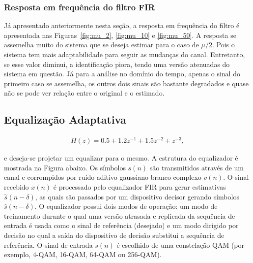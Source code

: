 \subsubsection*{Resposta em frequência do ﬁltro FIR}
Já apresentado anteriormente nesta seção, a resposta em frequência do filtro é apresentada nas Figuras~\ref{fig:mu_2}, \ref{fig:mu_10} e \ref{fig:mu_50}. A resposta se assemelha muito do sistema que se deseja estimar para o caso de $\mu/2$. Pois o sistema tem mais adaptabilidade para seguir as mudanças do canal. Entretanto, se esse valor diminui, a identificação piora, tendo uma versão atenuadas do sistema em questão. Já para a análise no domínio do tempo, apenas o sinal do primeiro caso se assemelha, os outros dois sinais são bastante degradados e quase não se pode ver relação entre o original e o estimado.


\subsection{Equalização Adaptativa} %

    
\begin{align*}
    H(z) = 0.5 + 1.2z^{-1} + 1.5z^{-2} + z^{-3},
\end{align*}

e deseja-se projetar um equalizar para o mesmo. A estrutura do equalizador é mostrada na Figura abaixo. Os símbolos $s(n)$ são transmitidos através de um canal e corrompidos por ruído aditivo gaussiano branco complexo $v(n)$. O sinal recebido $x(n)$ é processado pelo equalizador FIR para gerar estimativas $\overset{\sim}{s}(n - \delta)$, as quais são passados por um dispositivo decisor gerando  símbolos $\hat{s}(n - \delta)$. O equalizador possui dois modos de operação: um modo de treinamento durante o qual uma versão atrasada e  replicada da sequência de entrada é usada como o sinal de referência (desejado) e um modo dirigido por decisão no qual a saída do dispositivo de decisão substitui a sequência de referência. O sinal de entrada $s(n)$ é escolhido de uma constelação QAM (por exemplo, 4-QAM, 16-QAM, 64-QAM ou 256-QAM).




